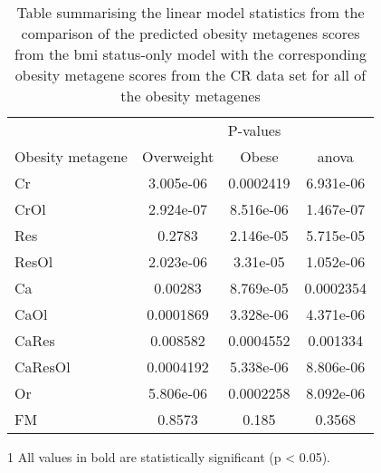 \begin{appendices}
	\begin{table}[htpb]
		\centering
		\caption[Summary of the statistics from the comparison of all the predicted obesity metagene scores from the \gls{bmi} status-only model with the corresponding obesity metagenes from the CR data]{Table summarising the linear model statistics from the comparison of the predicted obesity metagenes scores from the \gls{bmi} status-only model with the corresponding obesity metagene scores from the CR data set for all of the obesity metagenes}
		\label{tab:bmi_status_cr}
		\begin{threeparttable}
			\begin{tabular}{lccc}
				& \multicolumn{3}{c}{ P-values} \\
				\cmidrule(r){2-4}
				Obesity metagene & Overweight & Obese & \gls{anova} \\
				\hline
				\hline
				\rule{0pt}{2.25ex}Cr & 3.005e-06 & 0.0002419 & 6.931e-06  \\
				CrOl                 & 2.924e-07 & 8.516e-06 & 1.467e-07  \\
				Res                  & 0.2783    & 2.146e-05 & 5.715e-05  \\
				ResOl                & 2.023e-06 & 3.31e-05  & 1.052e-06  \\
				Ca                   & 0.00283   & 8.769e-05 & 0.0002354  \\
				CaOl                 & 0.0001869 & 3.328e-06 & 4.371e-06  \\
				CaRes                & 0.008582  & 0.0004552 & 0.001334   \\
				CaResOl              & 0.0004192 & 5.338e-06 & 8.806e-06  \\
				Or                   & 5.806e-06 & 0.0002258 & 8.092e-06  \\
				FM                   & 0.8573    & 0.185     & 0.3568     \\
				\hline
				\hline
			\end{tabular}
			\begin{tablenotes}
				\begin{footnotesize}
				\item [1] All values in bold are statistically significant (p \textless{} 0.05).
				\end{footnotesize}
			\end{tablenotes}
		\end{threeparttable}
	\end{table}

\end{appendices}
